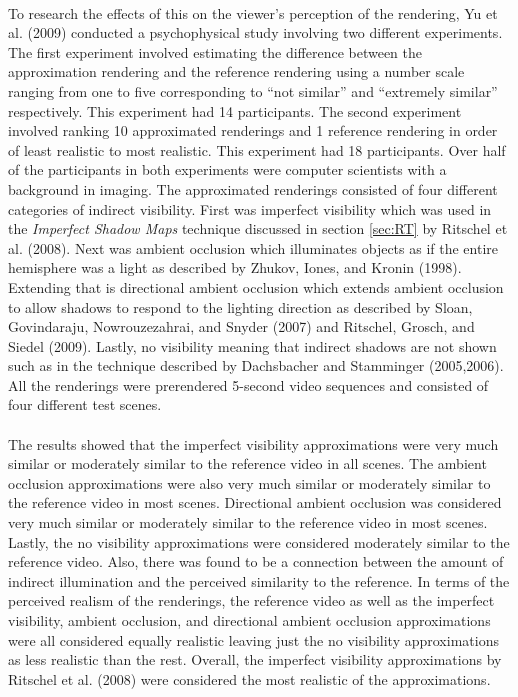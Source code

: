 \paragraph{}
To research the effects of this on the viewer's perception of the rendering, Yu et al. (2009) conducted a psychophysical study involving two different experiments.  The first experiment involved estimating the difference between the approximation rendering and the reference rendering using a number scale ranging from one to five corresponding to ``not similar'' and ``extremely similar'' respectively.  This experiment had 14 participants.  The second experiment involved ranking 10 approximated renderings and 1 reference rendering in order of least realistic to most realistic.  This experiment had 18 participants.  Over half of the participants in both experiments were computer  scientists with a background in imaging.  The approximated renderings consisted of four different categories of indirect visibility.  First was imperfect visibility which was used in the \textit{Imperfect Shadow Maps} technique discussed in section \ref{sec:RT} by Ritschel et al. (2008).  Next was ambient occlusion which illuminates objects as if the entire hemisphere was a light as described by Zhukov, Iones, and Kronin (1998).  Extending that is directional ambient occlusion which extends ambient occlusion to allow shadows to respond to the lighting direction as described by Sloan, Govindaraju, Nowrouzezahrai, and Snyder (2007) and Ritschel, Grosch, and Siedel (2009).  Lastly, no visibility meaning that indirect shadows are not shown such as in the technique described by Dachsbacher and Stamminger (2005,2006).  All the renderings were prerendered 5-second video sequences and consisted of four different test scenes.

\paragraph{}
The results showed that the imperfect visibility approximations were very much similar or moderately similar to the reference video in all scenes.  The ambient occlusion approximations were also very much similar or moderately similar to the reference video in most scenes.  Directional ambient occlusion was considered very much similar or moderately similar to the reference video in most scenes.  Lastly, the no visibility approximations were considered moderately similar to the reference video.  Also, there was found to be a connection between the amount of indirect illumination and the perceived similarity to the reference.  In terms of the perceived realism of the renderings, the reference video as well as the imperfect visibility, ambient occlusion, and directional ambient occlusion approximations were all considered equally realistic leaving just the no visibility approximations as less realistic than the rest.  Overall, the imperfect visibility approximations by Ritschel et al. (2008) were considered the most realistic of the approximations.

